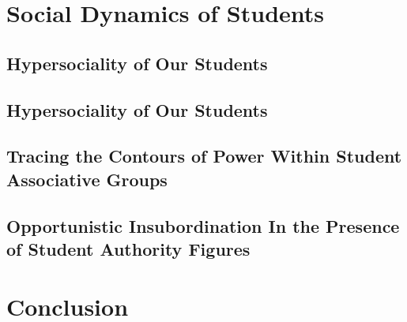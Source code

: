 \documentclass[12pt]{article}
\begin{document}
  \section{Social Dynamics of Students}
  \subsection{Hypersociality of Our Students}
  \subsection{Hypersociality of Our Students}
  \subsection{Tracing the Contours of Power Within Student Associative Groups}
  \subsection{Opportunistic Insubordination In the Presence of Student Authority Figures}

  \section{Conclusion}
  \pagebreak
\end{document}
